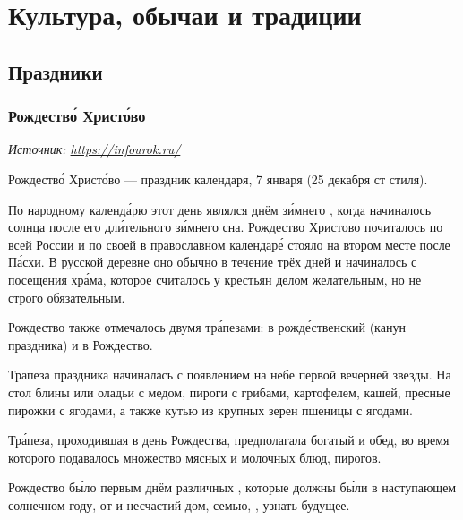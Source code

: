 \chapter{Культура, обычаи и традиции}

\section{Праздники}
\subsection{Рождеств\'{о} Христ\'{о}во}

\textit{Источник: \url{https://infourok.ru/}}

Рождеств\'{о} Христ\'{о}во --- праздник  календаря,  7 января (25 декабря ст стиля).

По народному календ\'{а}рю этот день являлся днём з\'{и}мнего , когда начиналось  солнца после его дл\'{и}тельного з\'{и}мнего сна. Рождество Христово почиталось по всей России и по своей  в православном календар\'{е} стояло на втором месте после П\'{а}схи. В русской деревне оно  обычно в течение трёх дней и начиналось с посещения хр\'{а}ма, которое считалось у крестьян делом желательным, но не строго обязательным.

Рождество также отмечалось двумя тр\'{а}пезами: в рожд\'{е}ственский  (канун праздника) и  в Рождество.

Трапеза  праздника начиналась с появлением на небе первой вечерней звезды. На стол  блины или оладьи с медом,  пироги с грибами, картофелем, кашей, пресные пирожки с ягодами, а также кутью из крупных зерен пшеницы с ягодами.

Тр\'{а}пеза, проходившая в день Рождества, предполагала богатый и  обед, во время которого подавалось множество мясных и молочных блюд, пирогов.

Рождество б\'{ы}ло первым днём  различных , которые должны б\'{ы}ли   в наступающем солнечном году,  от  и несчастий дом, семью, , узнать будущее.

